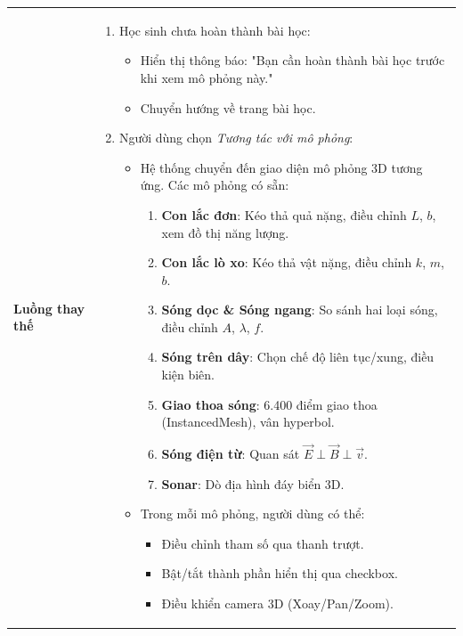 \begin{longtable}{|p{}|p{}|}
\hline
\textbf{Luồng thay thế} &
\vspace{-\baselineskip}
\begin{enumerate}[topsep=2pt, itemsep=0pt]
    \item[5a.] Học sinh chưa hoàn thành bài học:
    \begin{itemize}[topsep=0pt, itemsep=0pt]
        \item Hiển thị thông báo: "Bạn cần hoàn thành bài học trước khi xem mô phỏng này."
        \item Chuyển hướng về trang bài học.
    \end{itemize}
    \item[6a.] Người dùng chọn \textit{Tương tác với mô phỏng}:
    \begin{itemize}[topsep=0pt, itemsep=0pt]
        \item Hệ thống chuyển đến giao diện mô phỏng 3D tương ứng. Các mô phỏng có sẵn:
        \begin{enumerate}[label=\textbf{Sim \arabic*}, topsep=0pt, itemsep=0pt]
            \item \textbf{Con lắc đơn}: Kéo thả quả nặng, điều chỉnh $L$, $b$, xem đồ thị năng lượng.
            \item \textbf{Con lắc lò xo}: Kéo thả vật nặng, điều chỉnh $k$, $m$, $b$.
            \item \textbf{Sóng dọc \& Sóng ngang}: So sánh hai loại sóng, điều chỉnh $A$, $\lambda$, $f$.
            \item \textbf{Sóng trên dây}: Chọn chế độ liên tục/xung, điều kiện biên.
            \item \textbf{Giao thoa sóng}: 6.400 điểm giao thoa (InstancedMesh), vân hyperbol.
            \item \textbf{Sóng điện từ}: Quan sát $\vec{E} \perp \vec{B} \perp \vec{v}$.
            \item \textbf{Sonar}: Dò địa hình đáy biển 3D.
        \end{enumerate}
        \item Trong mỗi mô phỏng, người dùng có thể:
        \begin{itemize}[topsep=0pt, itemsep=0pt]
            \item Điều chỉnh tham số qua thanh trượt.
            \item Bật/tắt thành phần hiển thị qua checkbox.
            \item Điều khiển camera 3D (Xoay/Pan/Zoom).

\end{itemize}
\end{itemize}
\end{enumerate}
\end{longtable}
